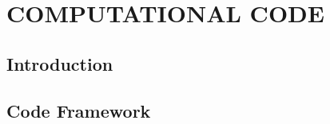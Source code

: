 \chapter{\textbf{COMPUTATIONAL CODE}}
\label{codigo numerico}

\section{\textbf{Introduction}} 


\section{\textbf{Code Framework}} 
\label{trimesh}


